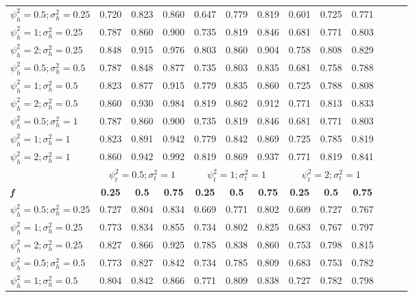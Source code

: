 \begin{table}[ht]
{\begin{tabular}{l c c c c c c c c c c c c}
\hline
$\psi_h^2 = 0.5; \sigma_h^2 = 0.25$ & 0.720 & 0.823 & 0.860 & 0.647 & 0.779 & 0.819 & 0.601 & 0.725 & 0.771 \\
$\psi_h^2 = 1; \sigma_h^2 = 0.25$ & 0.787 & 0.860 & 0.900 & 0.735 & 0.819 & 0.846 & 0.681 & 0.771 & 0.803 \\
$\psi_h^2 = 2; \sigma_h^2 = 0.25$ & 0.848 & 0.915 & 0.976 & 0.803 & 0.860 & 0.904 & 0.758 & 0.808 & 0.829 \\
$\psi_h^2 = 0.5; \sigma_h^2 = 0.5$ & 0.787 & 0.848 & 0.877 & 0.735 & 0.803 & 0.835 & 0.681 & 0.758 & 0.788 \\
$\psi_h^2 = 1; \sigma_h^2 = 0.5$ & 0.823 & 0.877 & 0.915 & 0.779 & 0.835 & 0.860 & 0.725 & 0.788 & 0.808 \\
$\psi_h^2 = 2; \sigma_h^2 = 0.5$ & 0.860 & 0.930 & 0.984 & 0.819 & 0.862 & 0.912 & 0.771 & 0.813 & 0.833 \\
$\psi_h^2 = 0.5; \sigma_h^2 = 1$ & 0.787 & 0.860 & 0.900 & 0.735 & 0.819 & 0.846 & 0.681 & 0.771 & 0.803 \\
$\psi_h^2 = 1; \sigma_h^2 = 1$ & 0.823 & 0.891 & 0.942 & 0.779 & 0.842 & 0.869 & 0.725 & 0.785 & 0.819 \\
$\psi_h^2 = 2; \sigma_h^2 = 1$ & 0.860 & 0.942 & 0.992 & 0.819 & 0.869 & 0.937 & 0.771 & 0.819 & 0.841 \\
\hline 
 & \multicolumn{3}{c}{$\psi_t^2 = 0.5; \sigma_t^2 = 1$} & \multicolumn{3}{c}{$\psi_t^2 = 1; \sigma_t^2 = 1$} & \multicolumn{3}{c}{$\psi_t^2 = 2; \sigma_t^2 = 1$} \\
\addlinespace[1pt]
\cmidrule(lr){2-4} \cmidrule(lr){5-7} \cmidrule(lr){8-10}
\addlinespace[1pt]
\textbf{\textit{f}} & \textbf{0.25} & \textbf{0.5} & \textbf{0.75} & \textbf{0.25} & \textbf{0.5} & \textbf{0.75} & \textbf{0.25} & \textbf{0.5} & \textbf{0.75} \\
\hline
$\psi_h^2 = 0.5; \sigma_h^2 = 0.25$ & 0.727 & 0.804 & 0.834 & 0.669 & 0.771 & 0.802 & 0.609 & 0.727 & 0.767 \\
$\psi_h^2 = 1; \sigma_h^2 = 0.25$ & 0.773 & 0.834 & 0.855 & 0.734 & 0.802 & 0.825 & 0.683 & 0.767 & 0.797 \\
$\psi_h^2 = 2; \sigma_h^2 = 0.25$ & 0.827 & 0.866 & 0.925 & 0.785 & 0.838 & 0.860 & 0.753 & 0.798 & 0.815 \\
$\psi_h^2 = 0.5; \sigma_h^2 = 0.5$ & 0.773 & 0.827 & 0.842 & 0.734 & 0.785 & 0.809 & 0.683 & 0.753 & 0.782 \\
$\psi_h^2 = 1; \sigma_h^2 = 0.5$ & 0.804 & 0.842 & 0.866 & 0.771 & 0.809 & 0.838 & 0.727 & 0.782 & 0.798 \\

\end{tabular}}
\end{table}
